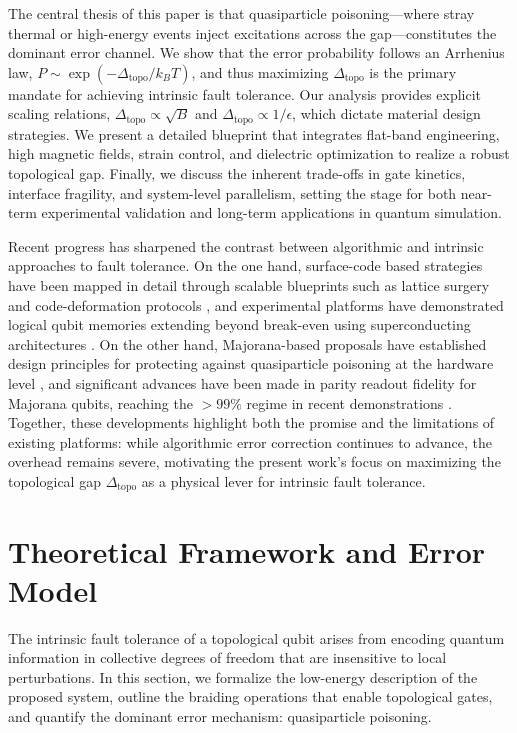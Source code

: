 \documentclass[aps,prl,twocolumn,superscriptaddress]{revtex4-2}
\begin{document}
The central thesis of this paper is that quasiparticle poisoning—where stray thermal or high-energy events inject excitations across the gap—constitutes the dominant error channel. We show that the error probability follows an Arrhenius law, $P \sim \exp(-\Delta_{\text{topo}}/k_B T)$, and thus maximizing $\Delta_{\text{topo}}$ is the primary mandate for achieving intrinsic fault tolerance. Our analysis provides explicit scaling relations, $\Delta_{\text{topo}} \propto \sqrt{B}$ and $\Delta_{\text{topo}} \propto 1/\epsilon$, which dictate material design strategies. We present a detailed blueprint that integrates flat-band engineering, high magnetic fields, strain control, and dielectric optimization to realize a robust topological gap. Finally, we discuss the inherent trade-offs in gate kinetics, interface fragility, and system-level parallelism, setting the stage for both near-term experimental validation and long-term applications in quantum simulation.

Recent progress has sharpened the contrast between algorithmic and intrinsic approaches to fault tolerance. 
On the one hand, surface-code based strategies have been mapped in detail through scalable blueprints such as lattice surgery and code-deformation protocols \cite{Litinski2019}, and experimental platforms have demonstrated logical qubit memories extending beyond break-even using superconducting architectures \cite{Willow2025}. 
On the other hand, Majorana-based proposals have established design principles for protecting against quasiparticle poisoning at the hardware level \cite{Karzig2017}, and significant advances have been made in parity readout fidelity for Majorana qubits, reaching the $> 99\%$ regime in recent demonstrations \cite{Higginbotham2024,Frolov2025}. 
Together, these developments highlight both the promise and the limitations of existing platforms: while algorithmic error correction continues to advance, the overhead remains severe, motivating the present work’s focus on maximizing the topological gap $\Delta_{\text{topo}}$ as a physical lever for intrinsic fault tolerance.


\section{Theoretical Framework and Error Model}

The intrinsic fault tolerance of a topological qubit arises from encoding quantum information in collective degrees of freedom that are insensitive to local perturbations. In this section, we formalize the low-energy description of the proposed system, outline the braiding operations that enable topological gates, and quantify the dominant error mechanism: quasiparticle poisoning.
\end{document}
